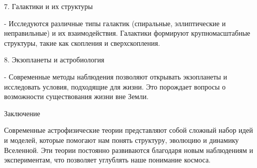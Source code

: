 \documentclass[exam_answers.tex]{subfiles}
\begin{document}
7. Галактики и их структуры

   - Исследуются различные типы галактик (спиральные, эллиптические и неправильные) и их взаимодействия. Галактики формируют крупномасштабные структуры, такие как скопления и сверхскопления.

8. Экзопланеты и астробиология

   - Современные методы наблюдения позволяют открывать экзопланеты и исследовать условия, подходящие для жизни. Это порождает вопросы о возможности существования жизни вне Земли.

Заключение

Современные астрофизические теории представляют собой сложный набор идей и моделей, которые помогают нам понять структуру, эволюцию и динамику Вселенной. Эти теории постоянно развиваются благодаря новым наблюдениям и экспериментам, что позволяет углублять наше понимание космоса.
\end{document}
